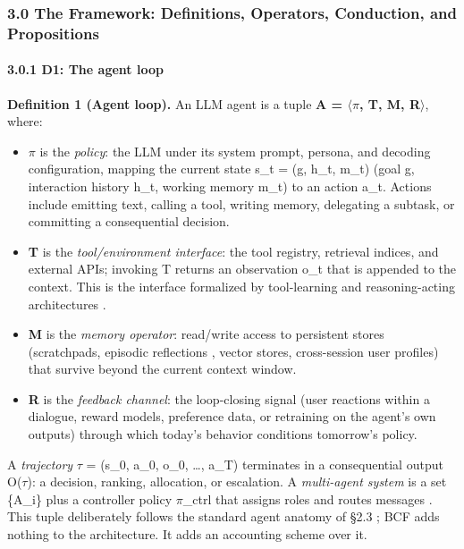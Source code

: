\documentclass[10pt]{article}
\begin{document}
\subsubsection*{3.0 The Framework: Definitions, Operators, Conduction, and Propositions}

\paragraph*{3.0.1 D1: The agent loop}

\textbf{Definition 1 (Agent loop).} An LLM agent is a tuple \textbf{A = $\langle$$\pi$, T, M, R$\rangle$}, where:

\begin{itemize}
\item \textbf{$\pi$} is the \emph{policy}: the LLM under its system prompt, persona, and decoding configuration, mapping the current state s\_t = (g, h\_t, m\_t) (goal g, interaction history h\_t, working memory m\_t) to an action a\_t. Actions include emitting text, calling a tool, writing memory, delegating a subtask, or committing a consequential decision.
\item \textbf{T} is the \emph{tool/environment interface}: the tool registry, retrieval indices, and external APIs; invoking T returns an observation o\_t that is appended to the context. This is the interface formalized by tool-learning and reasoning-acting architectures \cite{schick2023toolformer,yao2023react,qu2024tool}.
\item \textbf{M} is the \emph{memory operator}: read/write access to persistent stores (scratchpads, episodic reflections \cite{shinn2023reflexion}, vector stores, cross-session user profiles) that survive beyond the current context window.
\item \textbf{R} is the \emph{feedback channel}: the loop-closing signal (user reactions within a dialogue, reward models, preference data, or retraining on the agent's own outputs) through which today's behavior conditions tomorrow's policy.
\end{itemize}

A \emph{trajectory} $\tau$ = (s\_0, a\_0, o\_0, \ldots{}, a\_T) terminates in a consequential output O($\tau$): a decision, ranking, allocation, or escalation. A \emph{multi-agent system} is a set \{A\_i\} plus a controller policy $\pi$\_ctrl that assigns roles and routes messages \cite{wu2023autogen,guo2024large}. This tuple deliberately follows the standard agent anatomy of \S{}2.3 \cite{wang2024survey,xi2023rise,sumers2024cognitive}; BCF adds nothing to the architecture. It adds an accounting scheme over it.
\end{document}
